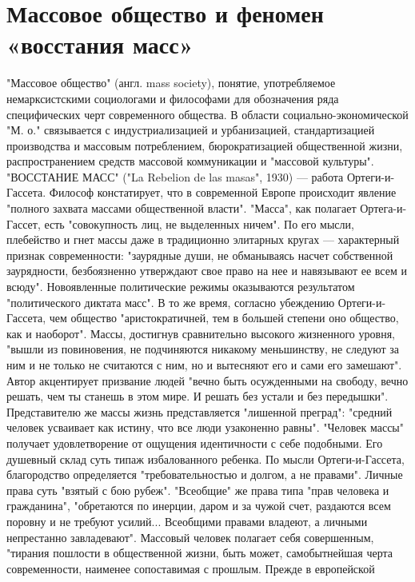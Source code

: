 \documentclass[12pt]{article}
\begin{document}
\newpage
\section{Массовое общество и феномен «восстания масс»}
"Массовое  общество"  (англ.  mass  society),  понятие,  употребляемое  немарксистскими  социологами  и
философами  для  обозначения  ряда  специфических  черт  современного  общества.  В  области  социально-экономической "М. о."  связывается с индустриализацией и урбанизацией,  стандартизацией  производства  и 
массовым  потреблением,  бюрократизацией  общественной  жизни,  распространением  средств  массовой
коммуникации и "массовой культуры".
"ВОССТАНИЕ МАСС" ("La Rebelion de las masas", 1930) — работа Ортеги-и-Гассета. Философ констатирует,
что в современной Европе происходит явление "полного захвата массами общественной власти". "Масса", как
полагает Ортега-и-Гассет, есть "совокупность лиц, не выделенных ничем". По его мысли, плебейство и гнет
массы даже в традиционно элитарных кругах — характерный признак современности: "заурядные души, не
обманываясь насчет собственной заурядности, безбоязненно утверждают свое право на нее и навязывают ее
всем и всюду". Новоявленные политические режимы оказываются результатом "политического диктата масс". В
то же время, согласно убеждению Ортеги-и-Гассета, чем общество "аристократичней, тем в большей степени
оно  общество, как и  наоборот".  Массы, достигнув  сравнительно высокого  жизненного уровня, "вышли  из
повиновения, не подчиняются никакому меньшинству, не следуют за ним и не только не считаются с ним, но и
вытесняют его и  сами его замешают". Автор  акцентирует  призвание  людей "вечно быть  осужденными на
свободу, вечно решать, чем ты станешь в этом мире. И решать без устали и без передышки". Представителю же
массы  жизнь  представляется  "лишенной  преград":  "средний  человек  усваивает  как  истину,  что  все  люди
узаконенно равны". "Человек массы" получает удовлетворение от ощущения идентичности с себе подобными.
Его  душевный  склад  суть  типаж  избалованного  ребенка.  По  мысли  Ортеги-и-Гассета,  благородство
определяется  "требовательностью  и  долгом,  а  не  правами".  Личные  права  суть  "взятый  с  бою  рубеж".
"Всеобщие" же права типа "прав человека и гражданина", "обретаются по инерции, даром и за чужой счет,
раздаются  всем  поровну  и  не  требуют  усилий...  Всеобщими  правами  владеют,  а  личными  непрестанно
завладевают". Массовый человек полагает себя совершенным, "тирания пошлости в общественной жизни, быть
может,  самобытнейшая  черта  современности,  наименее  сопоставимая  с  прошлым.  Прежде  в  европейской
\end{document}

